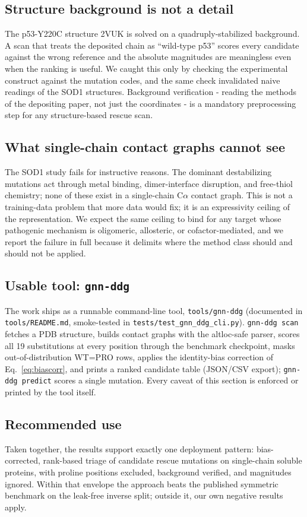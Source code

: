 \documentclass[11pt]{article}
\begin{document}
\subsection{Structure background is not a detail}
The p53-Y220C structure 2VUK is solved on a quadruply-stabilized
background. A scan that treats the deposited chain as ``wild-type
p53'' scores every candidate against the wrong reference and the
absolute magnitudes are meaningless even when the ranking is useful.
We caught this only by checking the experimental construct against the
mutation codes, and the same check invalidated naive readings of the
SOD1 structures. Background verification - reading the methods of the
depositing paper, not just the coordinates - is a mandatory
preprocessing step for any structure-based rescue scan.

\subsection{What single-chain contact graphs cannot see}
The SOD1 study fails for instructive reasons. The dominant
destabilizing mutations act through metal binding, dimer-interface
disruption, and free-thiol chemistry; none of these exist in a
single-chain C$\alpha$ contact graph. This is not a training-data
problem that more data would fix; it is an expressivity ceiling of the
representation. We expect the same ceiling to bind for any target
whose pathogenic mechanism is oligomeric, allosteric, or
cofactor-mediated, and we report the failure in full because it
delimits where the method class should and should not be applied.

\subsection{Usable tool: \texttt{gnn-ddg}}
The work ships as a runnable command-line tool, \texttt{tools/gnn-ddg}
(documented in \texttt{tools/README.md}, smoke-tested in
\texttt{tests/test\_gnn\_ddg\_cli.py}). \texttt{gnn-ddg scan} fetches a
PDB structure, builds contact graphs with the altloc-safe parser, scores
all 19 substitutions at every position through the benchmark checkpoint,
masks out-of-distribution WT=PRO rows, applies the identity-bias
correction of Eq.~\eqref{eq:biascorr}, and prints a ranked candidate
table (JSON/CSV export); \texttt{gnn-ddg predict} scores a single
mutation. Every caveat of this section is enforced or printed by the
tool itself.

\subsection{Recommended use}
Taken together, the results support exactly one deployment pattern:
bias-corrected, rank-based triage of candidate rescue mutations on
single-chain soluble proteins, with proline positions excluded,
background verified, and magnitudes ignored. Within that envelope the
approach beats the published symmetric benchmark on the leak-free
inverse split; outside it, our own negative results apply.
\end{document}
